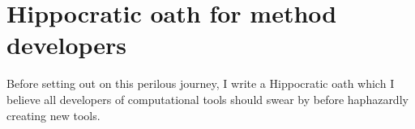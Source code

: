 
\newpage 
\section{Hippocratic oath for method developers}
Before setting out on this perilous journey, I write a Hippocratic oath 
which I believe all developers of computational tools should swear by 
before haphazardly creating new tools. 

